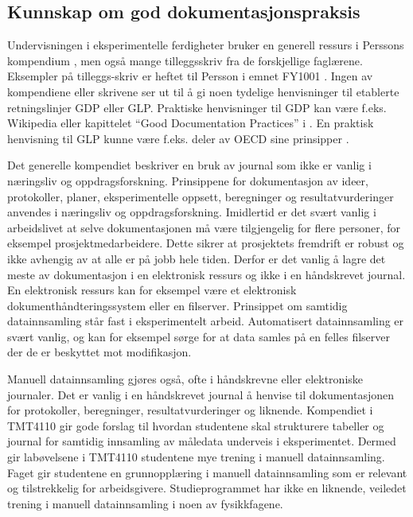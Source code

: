 \documentclass{article}
\begin{document}
\subsection{Kunnskap om god dokumentasjonspraksis}
Undervisningen i eksperimentelle ferdigheter bruker en generell ressurs i Perssons kompendium \cite{Persson2020}, men også mange tilleggsskriv fra de forskjellige faglærene. Eksempler på tilleggs-skriv er heftet til Persson i emnet FY1001 \cite{Persson2020FY1001}. Ingen av kompendiene eller skrivene ser ut til å gi noen tydelige henvisninger til etablerte retningslinjer GDP eller GLP. Praktiske henvisninger til GDP kan være f.eks. Wikipedia \cite{WikiGDP} eller kapittelet ``Good Documentation Practices'' i \cite{Davani2017}. En praktisk henvisning til GLP kunne være f.eks. deler av OECD sine prinsipper \cite{OECD1997}.

Det generelle kompendiet \cite{Persson2020} beskriver en bruk av journal som ikke er vanlig i næringsliv og oppdragsforskning. Prinsippene for dokumentasjon av ideer, protokoller, planer, eksperimentelle oppsett, beregninger og resultatvurderinger anvendes i næringsliv og oppdragsforskning. Imidlertid er det svært vanlig i arbeidslivet at selve dokumentasjonen må være tilgjengelig for flere personer, for eksempel prosjektmedarbeidere. Dette sikrer at prosjektets fremdrift er robust og ikke avhengig av at alle er på jobb hele tiden. Derfor er det vanlig å lagre det meste av dokumentasjon i en elektronisk ressurs og ikke i en håndskrevet journal. En elektronisk ressurs kan for eksempel være et elektronisk dokumenthåndteringssystem eller en filserver.
Prinsippet om samtidig datainnsamling står fast i eksperimentelt arbeid. Automatisert datainnsamling er svært vanlig, og kan for eksempel sørge for at data samles på en felles filserver der de er beskyttet mot modifikasjon.

Manuell datainnsamling gjøres også, ofte i håndskrevne eller elektroniske journaler. Det er vanlig i en håndskrevet journal å henvise til dokumentasjonen for protokoller, beregninger, resultatvurderinger og liknende. Kompendiet i TMT4110 gir gode forslag til hvordan studentene skal strukturere tabeller og journal for samtidig innsamling av måledata underveis i eksperimentet. Dermed gir labøvelsene i TMT4110 studentene mye trening i manuell datainnsamling. Faget gir studentene en grunnopplæring i manuell datainnsamling som er relevant og tilstrekkelig for arbeidsgivere. Studieprogrammet har ikke en liknende, veiledet trening i manuell datainnsamling i noen av fysikkfagene.
\end{document}
